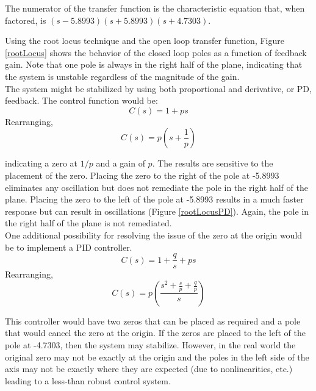 \documentclass[12pt,letterpaper]{article}
\begin{document}
The numerator of the transfer function is the characteristic equation that, when factored, is
$(s-5.8993) (s+5.8993) (s+4.7303)$.

Using the root locus technique and the open loop transfer function, Figure \ref{rootLocus} shows the
behavior of the closed loop poles as a function of feedback gain.  Note that one pole is always in the right
half of the plane, indicating that the system is unstable regardless of the magnitude of the gain. \\


The system might be stabilized by using both proportional and derivative, or PD, feedback.  The control function would be:
\begin{equation}
	C(s) = 1 + p s
\end{equation}
Rearranging,
\begin{equation}
	C(s) = p\left(s+\frac{1}{p}\right)\label{pd}
\end{equation}

indicating a zero at $1/p$ and a gain of $p$.
The results are sensitive to the placement of the zero.  Placing the zero to the right of the pole at -5.8993 
eliminates any oscillation but does not remediate the pole in the right half of the plane.  Placing the zero to the left of the pole at -5.8993 results in a much faster response but can result in oscillations (Figure \ref{rootLocusPD}).  Again, the pole in the right half of the plane is not remediated. \\


One additional possibility for resolving the issue of the zero at the origin would be to implement a PID controller.
\begin{equation}
	C(s) = 1 + \frac{q}{s} + p s
\end{equation}
Rearranging,
\begin{equation}
	C(s) = p\left(\frac{s^2+\frac{s}{p}+\frac{q}{p}}{s}\right)
\end{equation}

This controller would have two zeros that can be placed as required and a pole that would cancel
the zero at the origin.  If the zeros are placed to the left of the pole at -4.7303, then the system may stabilize.
However, in the real world the original zero may not be exactly at the origin and the poles in the left side of the axis may not be exactly where they are expected (due to nonlinearities, etc.) 
leading to a less-than robust control system. \\
\end{document}
